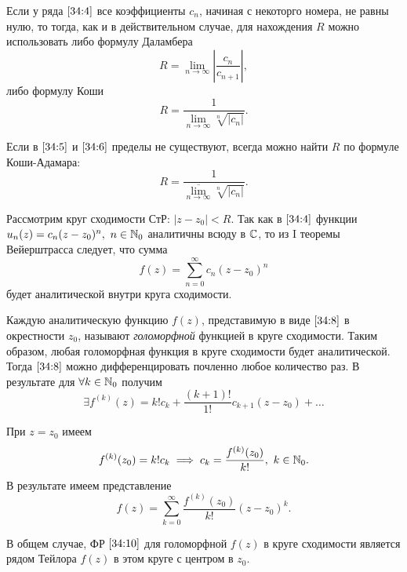 \documentclass[../../main.tex]{subfiles}
\begin{document}
Если у ряда $ \eqref{34:4} $ все коэффициенты $ c_n $, начиная с некоторго 
номера, не равны нулю, то тогда, как и в действительном случае, для 
нахождения $R$ можно использовать либо формулу Даламбера
\begin{equation}\label{34:5}
	R = \underset{n \to \infty}{\lim} \left|\frac{c_n}{c_{n+1}}\right|,
\end{equation}
либо формулу Коши
\begin{equation}\label{34:6}
	R = \frac{1}{\underset{n \to \infty}{\lim} \sqrt[n]{|c_n|}}.
\end{equation}

Если в $ \eqref{34:5} $ и $ \eqref{34:6} $ пределы не существуют, всегда можно 
найти $R$ по формуле Коши-Адамара:
\begin{equation}\label{34:7}
	R = \frac{1}{\overline{\underset{n \to \infty}{\lim}} \sqrt[n]{|c_n|}}.
\end{equation}

Рассмотрим круг сходимости СтР: $ |z - z_0| < R $. Так как в $ \eqref{34:4} $ 
функции $ 
u_n(z) = c_n(z - z_0)^n,\ n \in \mathbb{N}_0 $ аналитичны всюду в $ \mathbb{C} $, то из I 
теоремы Вейерштрасса следует, что сумма
\begin{equation}\label{34:8}
	f(z) = \sum\limits_{n = 0}^{\infty} c_n(z - z_0)^n
\end{equation}
будет аналитической внутри круга сходимости.

Каждую аналитическую функцию $ f(z) $, представимую в виде $ \eqref{34:8} $ в 
окрестности $z_0$, называют \emph{голоморфной} функцией в круге сходимости.
Таким образом, любая голоморфная функция в круге сходимости будет 
аналитической.
Тогда $ \eqref{34:8} $ можно дифференцировать почленно любое количество раз. В 
результате для $ \forall k \in \mathbb{N}_0 $ получим
\[ \exists f^{(k)}(z) = k!c_k + \frac{(k + 1)!}{1!}c_{k + 1}(z - z_0) + 
\ldots \]

При $ z = z_0 $ имеем
\begin{equation}\label{34:9}
	f^{(k)}(z_0) = k!c_k \implies c_k = \frac{f^{(k)}(z_0)}{k!},\ k \in \mathbb{N}_0.
\end{equation}
В результате имеем представление
\begin{equation}\label{34:10}
	f(z) = \sum\limits_{k = 0}^{\infty} \frac{f^{(k)}(z_0)}{k!}(z - z_0)^k.
\end{equation}

В общем случае, ФР $ \eqref{34:10} $ для голоморфной $ f(z) $ в круге 
сходимости является рядом Тейлора $ f(z) $ в этом круге с центром в $ z_0 $.
\end{document}
